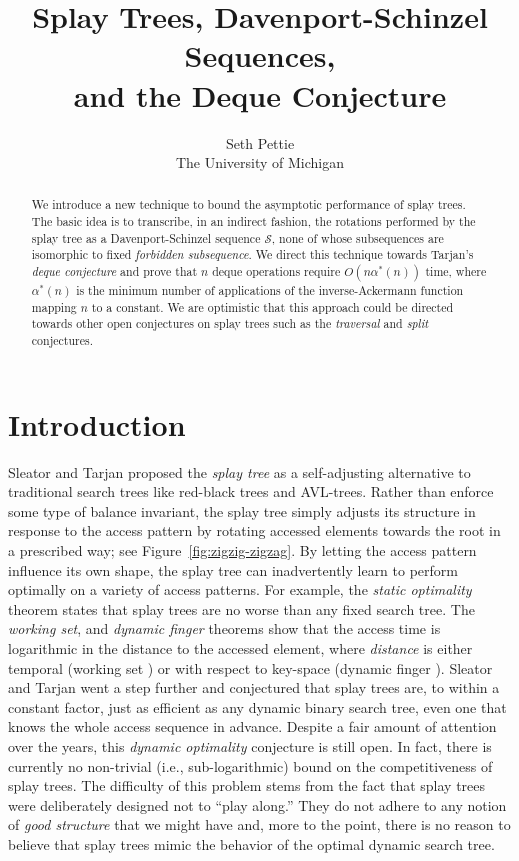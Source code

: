 \documentclass{article}
\title{Splay Trees, Davenport-Schinzel Sequences,\\
and the Deque Conjecture}
\author{Seth Pettie\\ The University of Michigan}
\date{}
\newcommand{\Seq}{\mathscr{S}}
\begin{document}
\maketitle
\begin{abstract}
We introduce a new technique to bound the asymptotic performance of splay trees.
The basic idea is to transcribe, in an indirect fashion, the rotations performed by the splay tree
as a Davenport-Schinzel sequence $\Seq$, none of whose subsequences are isomorphic to
fixed {\em forbidden subsequence}.
We direct this technique towards Tarjan's {\em deque conjecture} and prove that $n$ deque operations
require $O(n\alpha^*(n))$ time, where $\alpha^*(n)$ is the minimum number of applications of the inverse-Ackermann
function mapping $n$ to a constant.  We are optimistic that this approach could be directed towards other
open conjectures on splay trees such as the {\em traversal} and {\em split} conjectures.
\end{abstract}

\section{Introduction}

Sleator and Tarjan proposed the {\em splay tree} \cite{ST85} as a self-adjusting alternative to traditional search trees like red-black trees and AVL-trees.
Rather than enforce some type of balance invariant, the splay tree simply adjusts its structure in response to the access pattern by rotating accessed
elements towards the root in a prescribed way; see Figure~\ref{fig:zigzig-zigzag}.  
By letting the access pattern influence its own shape, the splay tree can inadvertently learn to perform
optimally on a variety of access patterns.  For example, the {\em static optimality} theorem states that splay trees are no worse than any fixed search tree.
The {\em working set}, and {\em dynamic finger} theorems show that the access time is logarithmic in the distance to the accessed 
element, where {\em distance} is either temporal (working set \cite{ST85}) or with respect to key-space (dynamic finger \cite{ColeEtal00,Cole00}).
Sleator and Tarjan went a step further and conjectured that splay trees are, to within a constant factor, just as efficient as any dynamic binary search
tree, even one that knows the whole access sequence in advance.  Despite a fair amount of attention over the years, this {\em dynamic optimality} conjecture
is still open.  In fact, there is currently no non-trivial (i.e., sub-logarithmic) bound on the competitiveness of splay trees.
The difficulty of this problem stems from the fact that splay trees were deliberately designed not to ``play along.''  They do not adhere to any notion
of {\em good structure} that we might have and, more to the point, there is no reason to believe that splay trees mimic the behavior of
the optimal dynamic search tree.
\end{document}
